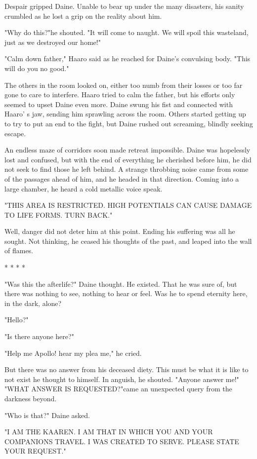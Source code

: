 Despair gripped Daine. Unable to bear up under the many disasters, his sanity crumbled as he lost a grip on the reality about him.

"Why do this?"he shouted. "It will come to naught. We will spoil this wasteland, just as we destroyed our home!"

"Calm down father," Haaro said as he reached for Daine's convulsing body. "This will do you no good."

The others in the room looked on, either too numb from their losses or too far gone to care to interfere. Haaro tried to calm the father, but his efforts only seemed to upset Daine even more. Daine swung his fist and connected with Haaro' s jaw, sending him sprawling across the room. Others started getting up to try to put an end to the fight, but Daine rushed out screaming, blindly seeking escape.

An endless maze of corridors soon made retreat impossible. Daine was hopelessly lost and confused, but with the end of everything he cherished before him, he did not seek to find those he left behind. A strange throbbing noise came from some of the passages ahead of him, and he headed in that direction. Coming into a large chamber, he heard a cold metallic voice speak.

"THIS AREA IS RESTRICTED. HIGH POTENTIALS CAN CAUSE DAMAGE TO LIFE FORMS. TURN BACK."

Well, danger did not deter him at this point. Ending his suffering was all he sought. Not thinking, he ceased his thoughts of the past, and leaped into the wall of flames.

* * * *

"Was this the afterlife?" Daine thought. He existed. That he was sure of, but there was nothing to see, nothing to
hear or feel. Was he to spend eternity here, in the dark, alone?

"Hello?"

"Is there anyone here?"

"Help me Apollo! hear my plea me," he cried.

But there was no answer from his deceased diety. This must be what it is like to not exist he thought to himself. In anguish, he shouted.
"Anyone answer me!"
"WHAT ANSWER IS REQUESTED?"came an unexpected query from the darkness beyond.

"Who is that?" Daine asked.

"I AM THE KAAREN. I AM THAT IN WHICH YOU AND YOUR COMPANIONS TRAVEL. I WAS CREATED TO SERVE. PLEASE STATE YOUR REQUEST."

